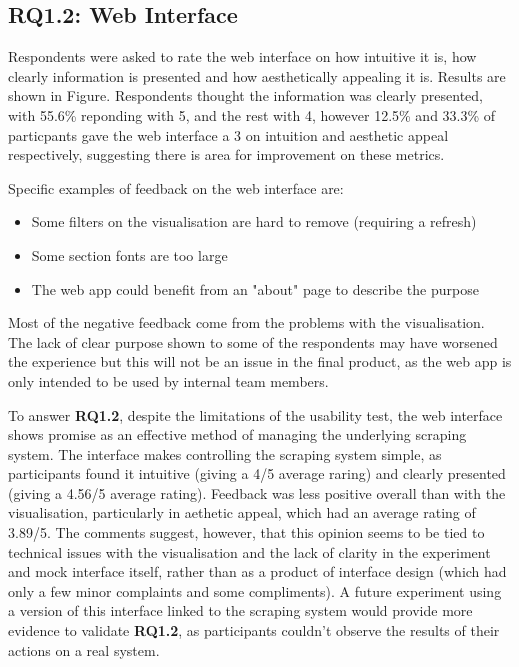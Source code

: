 \documentclass{l4proj}
\begin{document}
\subsection{RQ1.2: Web Interface}
Respondents were asked to rate the web interface on how intuitive it is, how clearly information is presented and how aesthetically appealing it is. Results are shown in Figure. Respondents thought the information was clearly presented, with 55.6\% reponding with 5, and the rest with 4, however 12.5\% and 33.3\% of particpants gave the web interface a 3 on intuition and aesthetic appeal respectively, suggesting there is area for improvement on these metrics. 

Specific examples of feedback on the web interface are:
\begin{itemize}
    \item Some filters on the visualisation are hard to remove (requiring a refresh)
    \item Some section fonts are too large
    \item The web app could benefit from an "about" page to describe the purpose
\end{itemize}

Most of the negative feedback come from the problems with the visualisation. The lack of clear purpose shown to some of the respondents may have worsened the experience but this will not be an issue in the final product, as the web app is only intended to be used by internal team members. \par 
To answer \textbf{RQ1.2}, despite the limitations of the usability test, the web interface shows promise as an effective method of managing the underlying scraping system. The interface makes controlling the scraping system simple, as participants found it intuitive (giving a 4/5 average raring) and clearly presented (giving a 4.56/5 average rating). Feedback was less positive overall than with the visualisation, particularly in aethetic appeal, which had an average rating of 3.89/5. The comments suggest, however, that this opinion seems to be tied to technical issues with the visualisation and the lack of clarity in the experiment and mock interface itself, rather than as a product of interface design (which had only a few minor complaints and some compliments). A future experiment using a version of this interface linked to the scraping system would provide more evidence to validate \textbf{RQ1.2}, as participants couldn't observe the results of their actions on a real system.
\end{document}
